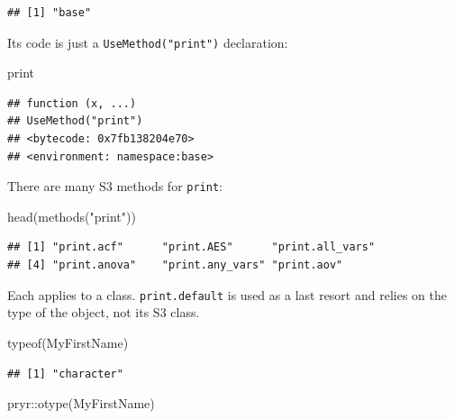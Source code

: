 \documentclass[
  12pt,
  american,
  a4paper,
  extrafontsizes,onecolumn,openright
  ]{memoir}
\newenvironment{Shaded}{\begin{snugshade}}{\end{snugshade}}
\newcommand{\FunctionTok}[1]{\textcolor[rgb]{0.00,0.00,0.00}{#1}}
\newcommand{\NormalTok}[1]{#1}
\newcommand{\SpecialCharTok}[1]{\textcolor[rgb]{0.00,0.00,0.00}{#1}}
\newcommand{\StringTok}[1]{\textcolor[rgb]{0.31,0.60,0.02}{#1}}
\begin{document}
\begin{verbatim}
## [1] "base"
\end{verbatim}

\normalsize

Its code is just a \texttt{UseMethod("print")} declaration:

\scriptsize

\begin{Shaded}
\begin{Highlighting}[]
\NormalTok{print}
\end{Highlighting}
\end{Shaded}

\begin{verbatim}
## function (x, ...) 
## UseMethod("print")
## <bytecode: 0x7fb138204e70>
## <environment: namespace:base>
\end{verbatim}

\normalsize

There are many S3 methods for \texttt{print}:

\scriptsize

\begin{Shaded}
\begin{Highlighting}[]
\FunctionTok{head}\NormalTok{(}\FunctionTok{methods}\NormalTok{(}\StringTok{"print"}\NormalTok{))}
\end{Highlighting}
\end{Shaded}

\begin{verbatim}
## [1] "print.acf"      "print.AES"      "print.all_vars"
## [4] "print.anova"    "print.any_vars" "print.aov"
\end{verbatim}

\normalsize

Each applies to a class. \texttt{print.default} is used as a last resort and relies on the type of the object, not its S3 class.

\scriptsize

\begin{Shaded}
\begin{Highlighting}[]
\FunctionTok{typeof}\NormalTok{(MyFirstName)}
\end{Highlighting}
\end{Shaded}

\begin{verbatim}
## [1] "character"
\end{verbatim}

\begin{Shaded}
\begin{Highlighting}[]
\NormalTok{pryr}\SpecialCharTok{::}\FunctionTok{otype}\NormalTok{(MyFirstName)}
\end{Highlighting}
\end{Shaded}
\end{document}
